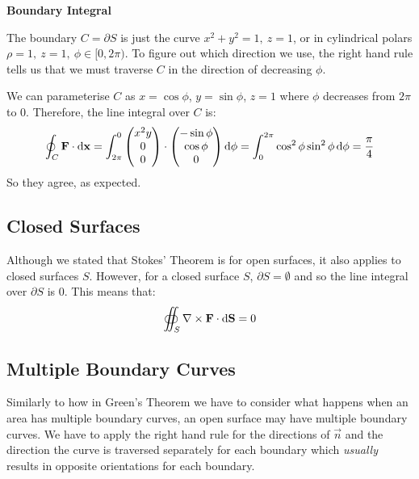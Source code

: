 \documentclass[../main.tex]{subfiles}
\begin{document}
\begin{example}
  \textbf{Boundary Integral}\par
  The boundary $C = \partial S$ is just the curve $x^2 + y^2 = 1,\ z = 1$, or in cylindrical polars $\rho = 1,\ z = 1,\ \phi \in [0, 2\pi)$.
  To figure out which direction we use, the right hand rule tells us that we must traverse $C$ in the direction of decreasing $\phi$.

  We can parameterise $C$ as $x = \cos \phi$, $y = \sin \phi$, $z = 1$ where $\phi$ decreases from $2\pi$ to $0$.
  Therefore, the line integral over $C$ is:
  \[
    \oint_{C} \vec{F} \cdot \d{\vec{x}} = \int_{2\pi}^{0} \begin{pmatrix}
    x^2 y \\
    0 \\
    0 \\
    \end{pmatrix} \cdot \begin{pmatrix}
    - \sin \phi \\
    \cos \phi \\
    0 \\
    \end{pmatrix} \d{\phi} = \int_{0}^{2\pi} \cos^2 \phi \sin^2 \phi \d{\phi} = \frac{\pi}{4}
  \]
  So they agree, as expected.
\end{example}
\subsection{Closed Surfaces}
Although we stated that Stokes' Theorem is for open surfaces, it also applies to closed surfaces $S$.
However, for a closed surface $S$, $\partial S = \emptyset$ and so the line integral over $\partial S$ is 0.
This means that:
\[
  \oiint_S \nabla \times \vec{F} \cdot \d{\vec{S}} = 0
\]
\subsection{Multiple Boundary Curves}
Similarly to how in Green's Theorem we have to consider what happens when an area has multiple boundary curves, an open surface may have multiple boundary curves.
We have to apply the right hand rule for the directions of $\vec{n}$ and the direction the curve is traversed separately for each boundary which \textit{usually} results in opposite orientations for each boundary.
\end{document}
